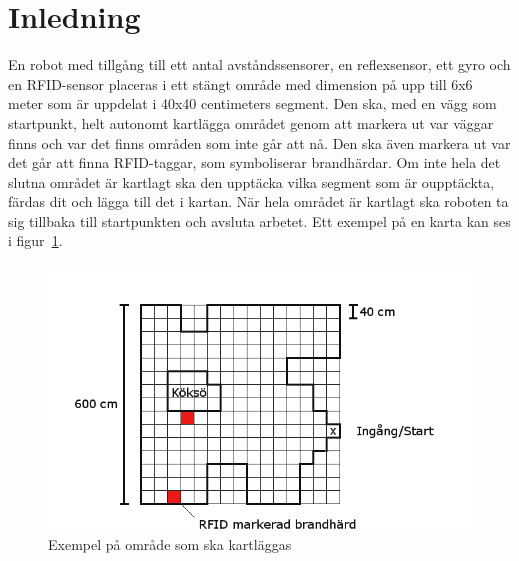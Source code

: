 \documentclass[a4paper,12pt,fleqn]{article}
\begin{document}
\thispagestyle{empty}
\addto\captionsswedish{\renewcommand{\contentsname}{Innehållsförteckning}}

\pagestyle{empty}
\tableofcontents
\cleardoublepage
\newpage
\pagestyle{fancy}
\section{Inledning}

En robot med tillgång till ett antal avståndssensorer, en reflexsensor, ett gyro och en RFID-sensor placeras i ett stängt område med dimension på upp till 6x6 meter som är uppdelat i 40x40 centimeters segment. 
Den ska, med en vägg som startpunkt, helt autonomt kartlägga området genom att markera ut var väggar finns och var det finns områden som inte går att nå. 
Den ska även markera ut var det går att finna RFID-taggar, som symboliserar brandhärdar. 
Om inte hela det slutna området är kartlagt ska den upptäcka vilka segment som är oupptäckta, färdas dit och lägga till det i kartan. 
När hela området är kartlagt ska roboten ta sig tillbaka till startpunkten och avsluta arbetet. Ett exempel på en karta kan ses i figur~\ref{fig:omrade}.
\begin{figure}[htp] %
  \begin{center}
  \includegraphics[keepaspectratio=true,scale=0.5]{gimpmap.png}  %
  \end{center}
  \caption{Exempel på område som ska kartläggas} %
  \label{fig:omrade}
\end{figure}
\end{document}
